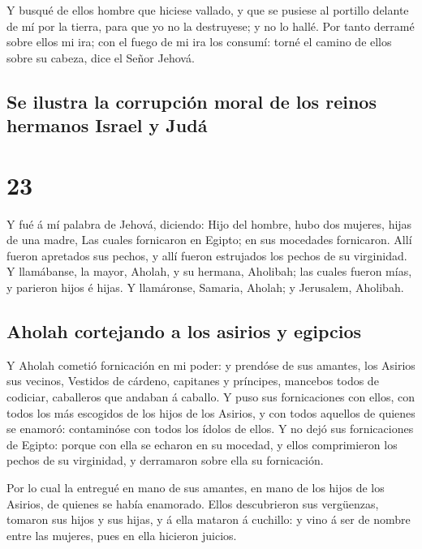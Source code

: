  Y busqué de ellos hombre que hiciese vallado, y que se
pusiese al portillo delante de mí por la tierra, para que yo no la
destruyese; y no lo hallé.  Por tanto derramé sobre ellos
mi ira; con el fuego de mi ira los consumí: torné el camino de ellos
sobre su cabeza, dice el Señor Jehová.

\hypertarget{se-ilustra-la-corrupciuxf3n-moral-de-los-reinos-hermanos-israel-y-juduxe1}{%
\subsection{Se ilustra la corrupción moral de los reinos hermanos Israel
y
Judá}\label{se-ilustra-la-corrupciuxf3n-moral-de-los-reinos-hermanos-israel-y-juduxe1}}

\hypertarget{section-22}{%
\section{23}\label{section-22}}

 Y fué á mí palabra de Jehová, diciendo:  Hijo
del hombre, hubo dos mujeres, hijas de una madre,  Las
cuales fornicaron en Egipto; en sus mocedades fornicaron. Allí fueron
apretados sus pechos, y allí fueron estrujados los pechos de su
virginidad.  Y llamábanse, la mayor, Aholah, y su hermana,
Aholibah; las cuales fueron mías, y parieron hijos é hijas. Y
llamáronse, Samaria, Aholah; y Jerusalem, Aholibah.

\hypertarget{aholah-cortejando-a-los-asirios-y-egipcios}{%
\subsection{Aholah cortejando a los asirios y
egipcios}\label{aholah-cortejando-a-los-asirios-y-egipcios}}

 Y Aholah cometió fornicación en mi poder: y prendóse de sus
amantes, los Asirios sus vecinos,  Vestidos de cárdeno,
capitanes y príncipes, mancebos todos de codiciar, caballeros que
andaban á caballo.  Y puso sus fornicaciones con ellos, con
todos los más escogidos de los hijos de los Asirios, y con todos
aquellos de quienes se enamoró: contaminóse con todos los ídolos de
ellos.  Y no dejó sus fornicaciones de Egipto: porque con
ella se echaron en su mocedad, y ellos comprimieron los pechos de su
virginidad, y derramaron sobre ella su fornicación.

 Por lo cual la entregué en mano de sus amantes, en mano de
los hijos de los Asirios, de quienes se había enamorado. 
Ellos descubrieron sus vergüenzas, tomaron sus hijos y sus hijas, y á
ella mataron á cuchillo: y vino á ser de nombre entre las mujeres, pues
en ella hicieron juicios.

